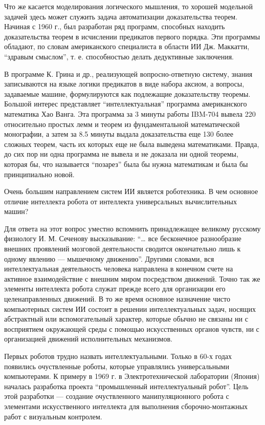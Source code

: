 Что же касается моделирования логического мышления, то хорошей модельной задачей здесь может служить задача автоматизации доказательства теорем. Начиная с 1960 г., был разработан ряд программ, способных находить доказательства теорем в исчислении предикатов первого порядка. Эти программы обладают, по словам американского специалиста в области ИИ Дж. Маккатти, ``здравым смыслом'', т. е. способностью делать дедуктивные заключения.

В программе К. Грина и др., реализующей вопросно-ответную систему, знания записываются на языке логики предикатов в виде набора аксиом, а вопросы, задаваемые машине, формулируются как подлежащие доказательству теоремы. Большой интерес представляет ``интеллектуальная'' программа американского математика Хао Ванга. Эта программа за 3 минуты работы IBM-704 вывела 220 относительно простых лемм и теорем из фундаментальной математической монографии, а затем за 8.5 минуты выдала доказательства еще 130 более сложных теорем, часть их которых еще не была выведена математиками. Правда, до сих пор ни одна программа не вывела и не доказала ни одной теоремы, которая бы, что называется ``позарез'' была бы нужна математикам и была бы принципиально новой.

Очень большим направлением систем ИИ является роботехника. В чем основное отличие интеллекта робота от интеллекта универсальных вычислительных машин?

Для ответа на этот вопрос уместно вспомнить принадлежащее великому русскому физиологу И. М. Сеченову высказывание: ``… все бесконечное разнообразие внешних проявлений мозговой деятельности сводится окончательно лишь к одному явлению — мышечному движению''. Другими словами, вся интеллектуальная деятельность человека направлена в конечном счете на активное взаимодействие с внешним миром посредством движений. Точно так же элементы интеллекта робота служат прежде всего для организации его целенаправленных движений. В то же время основное назначение чисто компьютерных систем ИИ состоит в решении интеллектуальных задач, носящих абстрактный или вспомогательный характер, которые обычно не связаны ни с восприятием окружающей среды с помощью искусственных органов чувств, ни с организацией движений исполнительных механизмов.

Первых роботов трудно назвать интеллектуальными. Только в 60-х годах появились очуствленные роботы, которые управлялись универсальными компьютерами. К примеру в 1969 г. в Электротехнической лаборатории (Япония) началась разработка проекта ``промышленный интеллектуальный робот''. Цель этой разработки — создание очуствленного манипуляционного робота с элементами искусственного интеллекта для выполнения сборочно-монтажных работ с визуальным контролем.

